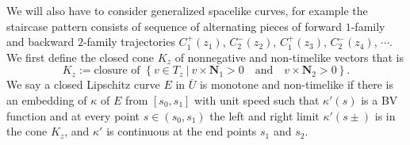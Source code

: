 \documentclass[11pt]{amsart}
\theoremstyle{plain}
\theoremstyle{remark}
\numberwithin{equation}{section}
\numberwithin{Thm}{section}
\def\U{\overline{U}}
\def\N{{\mathbf N}}
\begin{document}
We will also have to consider generalized spacelike curves, for example the staircase pattern consists of sequence of  alternating pieces of forward $1$-family and backward $2$-family trajectories $C^+_1(z_1)$, $C^-_2(z_2)$, $C^+_1(z_3)$, $C^-_2(z_4)$, $\cdots$. We first define the closed cone $K_z$ of nonnegative and non-timelike  vectors that is 
 \begin{equation} \label{Kz}
  K_z:= \text{closure of } \left\{ v \in T_z ~|~ v \times \N_1>0 \quad \text{and} \quad v \times \N_2>0\right\}.
 \end{equation}
  We say a closed Lipschitz curve $E$ in $\U$ is monotone and non-timelike if there is an embedding of $\kappa$ of $E$ from $[s_0, s_1]$ with unit speed such that $\kappa'(s)$ is a BV function and at every point $s\in(s_0,s_1)$ the left and right limit $\kappa'(s\pm)$ is in the cone $K_z$, and $\kappa'$ is continuous at the end points $s_1$ and $s_2$. %
\end{document}
